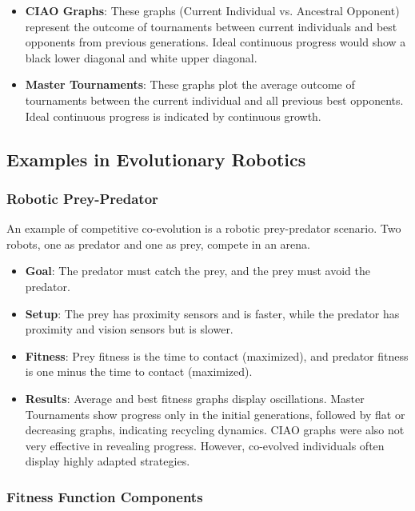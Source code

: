 \begin{itemize}
    \item \textbf{CIAO Graphs}: These graphs (Current Individual vs. Ancestral Opponent) represent the outcome of tournaments between current individuals and best opponents from previous generations. Ideal continuous progress would show a black lower diagonal and white upper diagonal.
    \item \textbf{Master Tournaments}: These graphs plot the average outcome of tournaments between the current individual and all previous best opponents. Ideal continuous progress is indicated by continuous growth.
\end{itemize}

\subsection*{Examples in Evolutionary Robotics}

\subsubsection*{Robotic Prey-Predator}

An example of competitive co-evolution is a robotic prey-predator scenario. Two robots, one as predator and one as prey, compete in an arena.
\begin{itemize}
    \item \textbf{Goal}: The predator must catch the prey, and the prey must avoid the predator.
    \item \textbf{Setup}: The prey has proximity sensors and is faster, while the predator has proximity and vision sensors but is slower.
    \item \textbf{Fitness}: Prey fitness is the time to contact (maximized), and predator fitness is one minus the time to contact (maximized).
    \item \textbf{Results}: Average and best fitness graphs display oscillations. Master Tournaments show progress only in the initial generations, followed by flat or decreasing graphs, indicating recycling dynamics. CIAO graphs were also not very effective in revealing progress.  However, co-evolved individuals often display highly adapted strategies.
\end{itemize}

\subsubsection*{Fitness Function Components}

